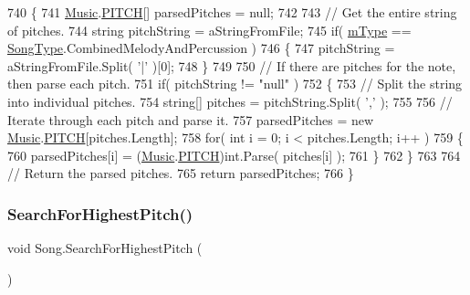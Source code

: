 \begin{DoxyCode}
740     \{
741         \hyperlink{class_music}{Music}.\hyperlink{group___music_enums_ga508f69b199ea518f935486c990edac1d}{PITCH}[] parsedPitches = null;
742 
743         \textcolor{comment}{// Get the entire string of pitches.}
744         \textcolor{keywordtype}{string} pitchString = aStringFromFile;
745         \textcolor{keywordflow}{if}( \hyperlink{group___song_priv_var_gaf3b9d0f461522324f897b746311b43c5}{mType} == \hyperlink{group___song_enums_gae681a1f001333e39fc1cb4fea97bfe1b}{SongType}.CombinedMelodyAndPercussion )
746         \{
747             pitchString = aStringFromFile.Split( \textcolor{charliteral}{'|'} )[0];
748         \}
749 
750         \textcolor{comment}{// If there are pitches for the note, then parse each pitch.}
751         \textcolor{keywordflow}{if}( pitchString != \textcolor{stringliteral}{"null"} )
752         \{
753             \textcolor{comment}{// Split the string into individual pitches.}
754             \textcolor{keywordtype}{string}[] pitches = pitchString.Split( \textcolor{charliteral}{','} );
755 
756             \textcolor{comment}{// Iterate through each pitch and parse it.}
757             parsedPitches = \textcolor{keyword}{new} \hyperlink{class_music}{Music}.\hyperlink{group___music_enums_ga508f69b199ea518f935486c990edac1d}{PITCH}[pitches.Length];
758             \textcolor{keywordflow}{for}( \textcolor{keywordtype}{int} i = 0; i < pitches.Length; i++ )
759             \{
760                 parsedPitches[i] = (\hyperlink{class_music}{Music}.\hyperlink{group___music_enums_ga508f69b199ea518f935486c990edac1d}{PITCH})\textcolor{keywordtype}{int}.Parse( pitches[i] );
761             \}
762         \}
763 
764         \textcolor{comment}{// Return the parsed pitches.}
765         \textcolor{keywordflow}{return} parsedPitches;
766     \}
\end{DoxyCode}
\mbox{\label{group___song_priv_func_ga5f837e6b7f576732fa38747caa057621}} 
\subsubsection{\texorpdfstring{Search\+For\+Highest\+Pitch()}{SearchForHighestPitch()}}
{\footnotesize\ttfamily void Song.\+Search\+For\+Highest\+Pitch (\begin{DoxyParamCaption}{ }\end{DoxyParamCaption})\hspace{0.3cm}{\ttfamily [private]}}



